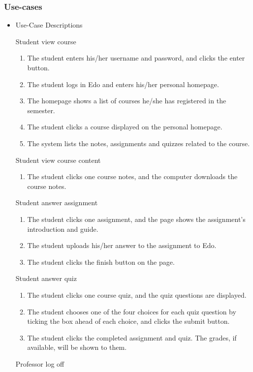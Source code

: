 \documentclass[paper=a4, fontsize=11pt]{scrartcl}
\numberwithin{equation}{section}		%
\numberwithin{figure}{section}			%
\numberwithin{table}{section}				%
\begin{document}
\subsubsection{Use-cases}
\begin{itemize}
	\item Use-Case Descriptions
	\par Student view course
	\begin{enumerate}
		\item The student enters his/her username and password, and clicks the enter button.
		\item The student logs in Edo and enters his/her personal homepage. 
		\item The homepage shows a list of courses he/she has registered in the semester.
		\item The student clicks a course displayed on the personal homepage.
		\item The system lists the notes, assignments and quizzes related to the course.
	\end{enumerate}
	\par Student view course content
	\begin{enumerate}
		\item The student clicks one course notes, and the computer downloads the course notes.
	\end{enumerate}
	\par Student answer assignment
	\begin{enumerate}
		\item The student clicks one assignment, and the page shows the assignment's introduction and guide.
		\item The student uploads his/her answer to the assignment to Edo.
		\item The student clicks the finish button on the page.
	\end{enumerate}
	\par Student answer quiz
	\begin{enumerate}
		\item The student clicks one course quiz, and the quiz questions are displayed.
		\item The student chooses one of the four choices for each quiz question by ticking the box ahead of each choice, and clicks the submit button.
		\item The student clicks the completed assignment and quiz. The grades, if available, will be shown to them. 
	\end{enumerate}
	\par Professor log off

\end{itemize}
\end{document}
